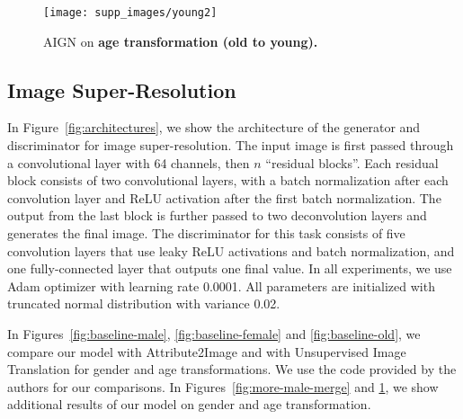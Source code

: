 \documentclass[10pt,twocolumn,letterpaper]{article}
\begin{document}
\begin{figure}[t]
    \centering
    \texttt{[image: supp\_images/young2]}
     \centering
    \caption{AIGN on \textbf{age transformation (old to young).}}
    \label{fig:more-young}
\end{figure}



\subsection{Image Super-Resolution}

In Figure~\ref{fig:architectures}, we show the architecture of the generator and discriminator for image super-resolution.
The input image is first passed through a convolutional layer with 64 channels, then $n$ ``residual blocks''. Each residual block consists of two convolutional 
layers, with a batch normalization after each convolution layer and ReLU activation
after the first batch normalization. The output from the last block is further passed to two deconvolution layers
and generates the final image. 
The discriminator for this task consists of five convolution layers that use leaky ReLU activations and batch normalization, and one fully-connected layer that outputs one final value.
In all experiments, we use Adam optimizer with learning rate 0.0001.%
All parameters are initialized with truncated normal distribution with variance 0.02. 



In Figures~\ref{fig:baseline-male}, \ref{fig:baseline-female} and \ref{fig:baseline-old}, we compare our model with Attribute2Image  \cite{DBLP:journals/corr/YanYSL15} and with Unsupervised Image Translation \cite{DBLP:journals/corr/DongNWG17} for gender and age transformations. 
We use the code provided by the authors for our comparisons. 
In Figures~\ref{fig:more-male-merge} and \ref{fig:more-young},
we show additional results of our model on gender and age transformation.
\end{document}
